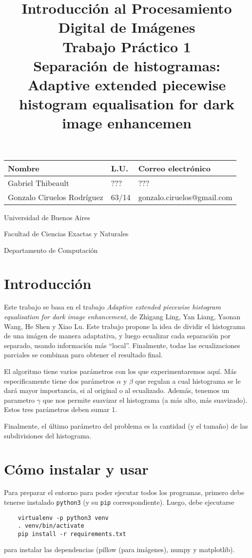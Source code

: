\documentclass[11pt, spanish]{article}
\title{Introducción al Procesamiento Digital de Imágenes\\
Trabajo Práctico 1 \\
\large Separación de histogramas: \\
Adaptive extended piecewise histogram equalisation for dark image
enhancemen}
\date{}
\author{}
\begin{document}
\maketitle
\begin{center}
\begin{large}
\begin{tabular}{|l|l|l|}
 \hline
 \textbf{Nombre} & \textbf{L.U.} & \textbf{Correo electrónico} \\
 \hline
 Gabriel Thibeault & ??? & ??? \\
 \hline
 Gonzalo Ciruelos Rodríguez & 63/14 & gonzalo.ciruelos@gmail.com \\
 \hline
\end{tabular}
\end{large}
\end{center}

\vspace{10cm}

\large{
Universidad de Buenos Aires

Facultad de Ciencias Exactas y Naturales

Departamento de Computación
}
\newpage

\section{Introducción}
Este trabajo se basa en el trabajo
\emph{Adaptive extended piecewise histogram equalisation for dark image enhancement},
de Zhigang Ling, Yan Liang, Yaonan Wang, He Shen y Xiao Lu.
Este trabajo propone la idea de dividir el histograma de una imágen de manera adaptativa, y luego
ecualizar cada separación por separado, usando información más ``local''. Finalmente, todas
las ecualizaciones parciales se combinan para obtener el resultado final.

El algoritmo tiene varios parámetros con los que experimentaremos aquí. Más especificamente tiene dos parámetros
$\alpha$ y $\beta$ que regulan a cual histograma se le dará mayor importancia, si al original o al ecualizado.
Además, tenemos un parametro $\gamma$ que nos permite suavizar el histograma (a más alto, más suavizado). Estos tres
parámetros deben sumar 1.

Finalmente, el último parámetro del problema es la cantidad (y el tamaño) de las subdivisiones del histograma.

\section{Cómo instalar y usar}
Para preparar el entorno para poder ejecutar todos los programas,
primero debe tenerse instalado \texttt{python3} (y su \texttt{pip} correspondiente).
Luego, debe ejecutarse 
\begin{verbatim}
    virtualenv -p python3 venv 
    . venv/bin/activate
    pip install -r requirements.txt 
\end{verbatim}
\noindent para instalar las dependencias (pillow (para imágenes), numpy y matplotlib).
\newpage
\end{document}
